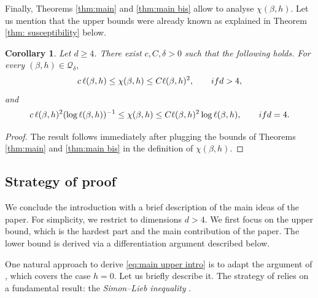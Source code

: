 \documentclass[10pt,a4paper]{amsart}
\numberwithin{equation}{section}
\newtheorem{Coro}[Thm]{Corollary}
\begin{document}
Finally, Theorems \ref{thm:main} and \ref{thm:main bis} allow to analyse $\chi(\beta,h)$. Let us mention that the upper bounds were already known as explained in Theorem \ref{thm: susceptibility} below.
\begin{Coro} Let $d\geq 4$. There exist $c,C,\delta>0$ such that the following holds. For every $(\beta,h)\in \mathcal Q_\delta$,
\begin{equation}
c\,\ell(\beta,h)\leq \chi(\beta,h)\leq C\ell(\beta,h)^2,\qquad \textup{if }d>4,
\end{equation}
and
\begin{equation}
c\,\ell(\beta,h)^2(\log \ell(\beta,h))^{-1}\leq \chi(\beta,h)\leq C\ell(\beta,h)^2\log \ell(\beta,h),\qquad \textup{if }d=4.
\end{equation}
\end{Coro}
\begin{proof} The result follows immediately after plugging the bounds of Theorems \ref{thm:main} and \ref{thm:main bis} in the definition of $\chi(\beta,h)$.
\end{proof}


\subsection{Strategy of proof}

We conclude the introduction with a brief description of the main ideas 
of the paper. For simplicity, we restrict to dimensions $d>4$. We first focus on the upper bound, which is the hardest part and the main 
contribution of the paper. The lower bound is derived via a 
differentiation argument described below.

\vspace{4pt}

One natural approach to derive \eqref{eq:main upper intro} is to adapt the argument of \cite{DuminilPanis2024newLB}, which covers the case $h=0$. Let us briefly describe it. The strategy of \cite{DuminilPanis2024newLB} relies on a fundamental result: the \emph{Simon--Lieb inequality} \cite{SimonInequalityIsing1980,LiebImprovementSimonInequality}.
\end{document}
